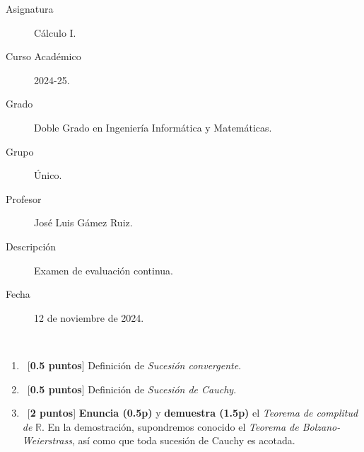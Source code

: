 \documentclass[12pt]{article}
\begin{document}

    
    

    \begin{description}
        \item[Asignatura] Cálculo I.
        \item[Curso Académico] 2024-25.
        \item[Grado] Doble Grado en Ingeniería Informática y Matemáticas.
        \item[Grupo] Único.
        \item[Profesor] José Luis Gámez Ruiz.
        \item[Descripción] Examen de evaluación continua.
        \item[Fecha] 12 de noviembre de 2024.
    
    \end{description}
    \newpage


    
    \begin{ejercicio}\ 
        \begin{enumerate}[label=\alph*)]
            \item\ [\textbf{0.5 puntos}] Definición de \textit{Sucesión convergente}.
            \item\ [\textbf{0.5 puntos}] Definición de \textit{Sucesión de Cauchy}.
            \item\ [\textbf{2 puntos}] \textbf{Enuncia (0.5p)} y \textbf{demuestra (1.5p)} el \textit{Teorema de complitud de} $\mathbb{R}$. En la demostración, supondremos conocido el \textit{Teorema de Bolzano-Weierstrass}, así como que toda sucesión de Cauchy es acotada.
        \end{enumerate}
    \end{ejercicio}
\end{document}
